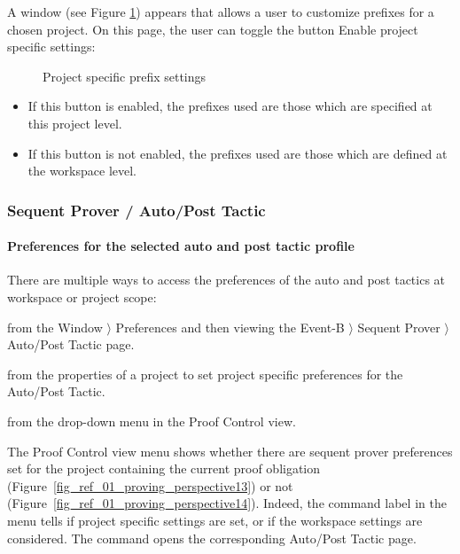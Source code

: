 A window (see Figure \ref{fig_ref_01_preferences2}) appears that allows a user to customize prefixes for a chosen project. On this page, the user can toggle the button \textsf{Enable project specific settings}:

\begin{figure}[!ht]
\begin{center}
	\caption{Project specific prefix settings}
	\label{fig_ref_01_preferences2}
\end{center}
\end{figure}

\begin{itemize}
	\item If this button is enabled, the prefixes used are those which are specified at this project level.
	\item If this button is not enabled, the prefixes used are those which are defined at the workspace level. 
\end{itemize}

\subsubsection{Sequent Prover / Auto/Post Tactic}
\label{ref_01_preferences_auto_post_tactic}

\paragraph{Preferences for the selected auto and post tactic profile}

There are multiple ways to access the preferences of the auto and post tactics at workspace or project scope: 
\begin{description}
	\item from the \textsf{Window} $\rangle $ \textsf{Preferences} and then viewing the \textsf{Event-B} $\rangle $ \textsf{Sequent Prover} $\rangle $ \textsf{Auto/Post Tactic} page.
	\item from the properties of a project to set project specific preferences for the \textsf{Auto/Post Tactic}.
	\item from the drop-down menu in the \textsf{Proof Control} view.
\end{description}
The \textsf{Proof Control} view menu shows whether there are sequent prover preferences set for the project containing the current proof obligation (Figure~\ref{fig_ref_01_proving_perspective13}) or not (Figure~\ref{fig_ref_01_proving_perspective14}).
Indeed, the command label in the menu tells if project specific settings are set, or if the workspace settings are considered. The command opens the corresponding \textsf{Auto/Post Tactic} page.

